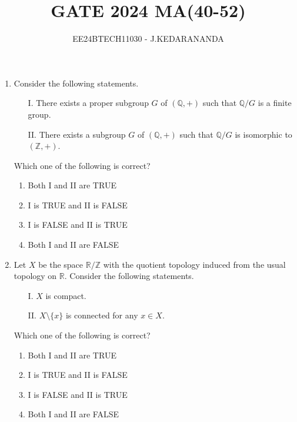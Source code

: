 \documentclass[journal]{IEEEtran}
\renewcommand{\thefigure}{\theenumi}
\renewcommand{\thetable}{\theenumi}
\numberwithin{equation}{enumi}
\numberwithin{figure}{enumi}
\renewcommand{\thetable}{\theenumi}
\begin{document}

\vspace{3cm}

\title{GATE 2024 MA(40-52)}
\author{EE24BTECH11030 - J.KEDARANANDA}
{\let\newpage\relax\maketitle}
\renewcommand{\thefigure}{\theenumi}
\renewcommand{\thetable}{\theenumi}
\begin{enumerate}
    \item Consider the following statements.
\begin{enumerate}
    \item[I.] There exists a proper subgroup $G$ of $(\mathbb{Q}, +)$ such that $\mathbb{Q}/G$ is a finite group.
    \item[II.] There exists a subgroup $G$ of $(\mathbb{Q}, +)$ such that $\mathbb{Q}/G$ is isomorphic to $(\mathbb{Z}, +)$.
\end{enumerate}
Which one of the following is correct?
\begin{enumerate}
    \item Both I and II are TRUE
    \item I is TRUE and II is FALSE
    \item I is FALSE and II is TRUE
    \item Both I and II are FALSE
\end{enumerate}
\bigskip
\item Let $X$ be the space $\mathbb{R}/\mathbb{Z}$ with the quotient topology induced from the usual topology on $\mathbb{R}$. Consider the following statements.
\begin{enumerate}
    \item[I.] $X$ is compact.
    \item[II.] $X \setminus \{x\}$ is connected for any $x \in X$.
\end{enumerate}
Which one of the following is correct?
\begin{enumerate}
    \item Both I and II are TRUE
    \item I is TRUE and II is FALSE
    \item I is FALSE and II is TRUE
    \item Both I and II are FALSE
\end{enumerate}

\end{enumerate}
\end{document}
